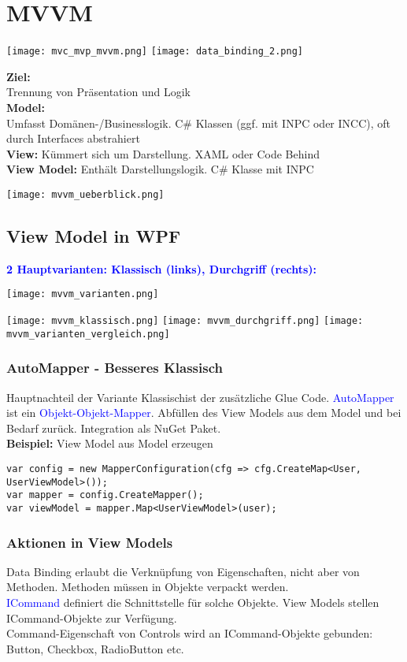 
\section{MVVM}
\texttt{[image: mvc\_mvp\_mvvm.png]}
\texttt{[image: data\_binding\_2.png]}
\begin{minipage}{0.54\linewidth}
    \textbf{Ziel:}\\
    Trennung von Präsentation und Logik\\
    \textbf{Model:}\\
    Umfasst Domänen-/Businesslogik. C\# Klassen (ggf. mit INPC oder INCC), oft durch Interfaces abstrahiert\\
    \textbf{View:} Kümmert sich um Darstellung. XAML oder Code Behind\\
    \textbf{View Model:} Enthält Darstellungslogik. C\# Klasse mit INPC
\end{minipage}
\begin{minipage}{0.46\linewidth}
    \texttt{[image: mvvm\_ueberblick.png]}
\end{minipage}
\subsection{View Model in WPF}
\textbf{\textcolor{blue}{2 Hauptvarianten: Klassisch (links), Durchgriff (rechts):}}
\begin{center}
    \texttt{[image: mvvm\_varianten.png]}
\end{center}
\texttt{[image: mvvm\_klassisch.png]}
\texttt{[image: mvvm\_durchgriff.png]}
\texttt{[image: mvvm\_varianten\_vergleich.png]}
\subsubsection{AutoMapper - Besseres Klassisch}
Hauptnachteil der Variante \dq Klassisch\dq ist der zusätzliche Glue Code. \textcolor{blue}{AutoMapper} ist ein \textcolor{blue}{Objekt-Objekt-Mapper}. Abfüllen des View Models aus dem Model und bei Bedarf zurück. Integration
als NuGet Paket.\\
\textbf{Beispiel:} View Model aus Model erzeugen
\begin{lstlisting}
var config = new MapperConfiguration(cfg => cfg.CreateMap<User, UserViewModel>());
var mapper = config.CreateMapper();
var viewModel = mapper.Map<UserViewModel>(user);
\end{lstlisting}
\subsubsection{Aktionen in View Models}
Data Binding erlaubt die Verknüpfung von Eigenschaften, nicht aber von Methoden. Methoden müssen in Objekte verpackt werden.\\
\textcolor{blue}{ICommand} definiert die Schnittstelle für solche Objekte. View Models stellen ICommand-Objekte zur Verfügung.\\
Command-Eigenschaft von Controls wird an ICommand-Objekte gebunden: Button, Checkbox, RadioButton etc.
